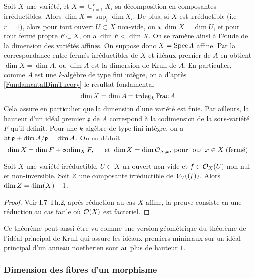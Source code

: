 Soit $X$ une variété, et $X=\cup_{i=1}^rX_i$ sa décomposition en composantes irréductibles. Alors $\dim X=\sup_i \dim X_i$. De plus, si $X$ est irréductible (i.e $r=1$), alors pour tout ouvert $U\subset X$ non-vide, on a $\dim X=\dim U$, et pour tout fermé propre $F\subset X$, on a $\dim F<\dim X$. On se ramène ainsi à l'étude de la dimension des variétés affines. On suppose donc $X=\operatorname{Spec} A$ affine. Par la correspondance entre fermés irréductibles de $X$ et idéaux premier de $A$ on obtient $\dim X= \dim A$, où $\dim A$ est la dimension de Krull de $A$. En particulier, comme $A$ est une $k$-algèbre de type fini intègre, on a d'après \ref{FundamentalDimTheory} le résultat fondamental
$$\dim X=\dim A=\operatorname{trdeg}_k \operatorname{Frac} A$$
Cela assure en particulier que la dimension d'une variété est finie. Par ailleurs, la hauteur d'un idéal premier $\mathfrak{p}$ de $A$ correspond à la codimension de la sous-variété $F$ qu'il définit. Pour une $k$-algèbre de type fini intègre, on a $\operatorname{ht} \mathfrak{p}+ \dim A/\mathfrak{p}=\dim A$. On en déduit
$$\dim X=\dim F+\operatorname{codim}_X F,\,\,\,\,\,\,\, \text{ et } \dim X=\dim\mathcal{O}_{X,x} \text{, pour tout } x\in X \text{ (fermé)}$$

\begin{thm}\label{dimsousvariete}
Soit $X$ une variété irréductible, $U\subset X$ un ouvert non-vide et $f\in \mathcal{O}_X(U)$ non nul et non-inversible. Soit $Z$ une composante irréductible de $\mathcal{V}_U((f))$. Alors $\operatorname{dim} Z= \operatorname{dim}(X)-1$.
\end{thm}
\begin{proof}
Voir \cite{MumfordRedBook} I.7 Th.2, après réduction au cas $X$ affine, la preuve consiste en une réduction au cas facile où $\mathcal{O}(X)$ est factoriel. 
\end{proof}

Ce théorème peut aussi être vu comme une version géométrique du théorème de l'idéal principal de Krull qui assure les idéaux premiers minimaux sur un idéal principal d'un anneau noetherien sont au plus de hauteur $1$.

\subsubsection{Dimension des fibres d'un morphisme}

